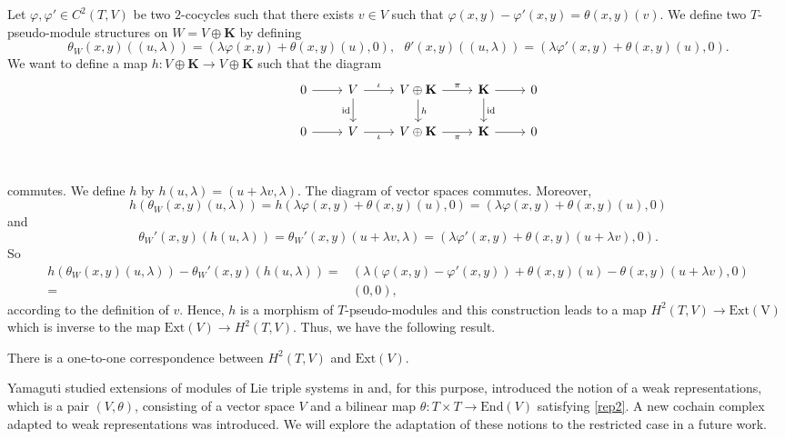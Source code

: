 \documentclass[11pt, twoside]{article}
\begin{document}
Let $\varphi,\varphi'\in C^2(T,V)$ be two $2$-cocycles such that there exists $v\in V$ such that $\varphi(x,y)-\varphi'(x,y)=\theta(x,y)(v). $ We define two $T$-pseudo-module structures on $W=V\oplus \mathbf{K} $ by defining $$\theta_W(x,y)((u,\lambda))=(\lambda\varphi(x,y)+\theta(x,y)(u),0), \ \ \ \theta'(x,y)((u,\lambda))=(\lambda\varphi'(x,y)+\theta(x,y)(u),0). $$ We want to define a map $h:V\oplus \mathbf{K}\to V\oplus\mathbf{K}$ such that the diagram \[\begin{tikzcd}
	& 0 & V & V\oplus \mathbf{K} & {\mathbf{K}} & 0 \\
	& 0 & V & V\oplus\mathbf{K} & {\mathbf{K}} & 0 \\
	{}
	\arrow[from=1-2, to=1-3]
	\arrow["\iota", from=1-3, to=1-4]
	\arrow["{\mathrm{id}}"', from=1-3, to=2-3]
	\arrow["\pi", from=1-4, to=1-5]
	\arrow["h", from=1-4, to=2-4]
	\arrow[from=1-5, to=1-6]
	\arrow["{\mathrm{id}}", from=1-5, to=2-5]
	\arrow[from=2-2, to=2-3]
	\arrow["\iota"', from=2-3, to=2-4]
	\arrow["\pi"', from=2-4, to=2-5]
	\arrow[from=2-5, to=2-6]
\end{tikzcd}\] commutes. We define $h$ by $h(u,\lambda)=(u+\lambda v,\lambda) $. The diagram of vector spaces commutes. Moreover, $$h(\theta_W(x,y)(u,\lambda))=h(\lambda\varphi(x,y)+\theta(x,y)(u),0)= (\lambda\varphi(x,y)+\theta(x,y)(u),0) $$ and $$\theta_W'(x,y)(h(u,\lambda))=\theta_W'(x,y)(u+\lambda v,\lambda)=(\lambda\varphi'(x,y)+\theta(x,y)(u+\lambda v),0) .$$ So  \begin{align*}
    h(\theta_W(x,y)(u,\lambda))- \theta_W'(x,y)(h(u,\lambda))=& (\lambda(\varphi(x,y)- \varphi'(x,y)) + \theta(x,y)(u)-\theta(x,y)(u+\lambda v),0)\\ =& (0,0),  
\end{align*} according to  the definition of $v$. Hence, $h$ is a morphism of $T$-pseudo-modules and this construction leads to a map $H^2(T,V)\to \mathrm{Ext(V)} $ which is inverse to the map $\mathrm{Ext}(V)\to H^2(T,V) $. Thus, we have the following result.

\begin{prop}
    There is a one-to-one correspondence between $H^2(T,V)$ and $\mathrm{Ext}(V) $.
\end{prop} 

\begin{rmq}
    Yamaguti studied extensions of modules of Lie triple systems in \cite{Y68} and, for this purpose, introduced the notion of a weak representations, which is a pair $(V,\theta) $, consisting of a vector space $V$ and a bilinear map $\theta:T\times T\to \mathrm{End}(V)$ satisfying \eqref{rep2}. A new cochain complex adapted to weak representations was introduced. We will explore the adaptation of these notions to the restricted case in a future work.
\end{rmq}
\end{document}
